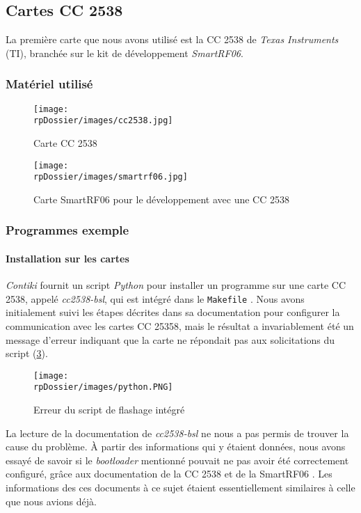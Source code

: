 \subsection{Cartes CC 2538}

La première carte que nous avons utilisé est la CC 2538 de \emph{Texas Instruments} (TI), branchée sur le kit de développement \emph{SmartRF06}.

\subsubsection{Matériel utilisé}

\begin{figure}[H]
\centering
\texttt{[image: \\rpDossier/images/cc2538.jpg]}
\caption{Carte CC 2538}
\label{cc2538}
\end{figure}

\begin{figure}[H]
\centering
\texttt{[image: \\rpDossier/images/smartrf06.jpg]}
\caption{Carte SmartRF06 pour le développement avec une CC 2538}
\label{smartrf06}
\end{figure}
\todo[descriptions]

\subsubsection{Programmes exemple}

\paragraph{Installation sur les cartes}

\emph{Contiki} fournit un script \emph{Python} pour installer un programme sur une carte CC 2538, appelé \emph{cc2538-bsl}, qui est intégré dans le \texttt{Makefile} .
Nous avons initialement suivi les étapes décrites dans sa documentation pour configurer la communication avec les cartes CC 25358, mais le résultat a invariablement été un message d’erreur indiquant que la carte ne répondait pas aux solicitations du script (\cref{bsl-error}).

\begin{figure}[H]
\centering
\texttt{[image: \\rpDossier/images/python.PNG]}
\caption{Erreur du script de flashage intégré}
\label{bsl-error}
\end{figure}

La lecture de la documentation de \emph{cc2538-bsl}  ne nous a pas permis de trouver la cause du problème.
À partir des informations qui y étaient données, nous avons essayé de savoir si le \textit{bootloader} mentionné pouvait ne pas avoir été correctement configuré, grâce aux documentation de la CC 2538 \cite{cc2538-user-guide} et de la SmartRF06 \cite{smartrf06-user-guide}.
Les informations des ces documents à ce sujet étaient essentiellement similaires à celle que nous avions déjà.

